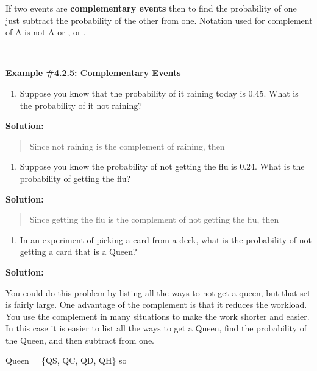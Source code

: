 \documentclass[]{book}
\providecommand{\tightlist}{%
  \setlength{\itemsep}{0pt}\setlength{\parskip}{0pt}}
\begin{document}
If two events are \textbf{complementary events} then to find the probability
of one just subtract the probability of the other from one. Notation
used for complement of A is not A or , or .

\textbf{\\
}

\textbf{Example \#4.2.5: Complementary Events}

\begin{enumerate}
\def\labelenumi{\alph{enumi}.}
\tightlist
\item
  Suppose you know that the probability of it raining today is 0.45.
  What is the probability of it not raining?
\end{enumerate}

\textbf{Solution:}

\begin{quote}
Since not raining is the complement of raining, then
\end{quote}

\begin{enumerate}
\def\labelenumi{\alph{enumi}.}
\setcounter{enumi}{1}
\tightlist
\item
  Suppose you know the probability of not getting the flu is 0.24.
  What is the probability of getting the flu?
\end{enumerate}

\textbf{Solution:}

\begin{quote}
Since getting the flu is the complement of not getting the flu, then
\end{quote}

\begin{enumerate}
\def\labelenumi{\alph{enumi}.}
\setcounter{enumi}{2}
\tightlist
\item
  In an experiment of picking a card from a deck, what is the
  probability of not getting a card that is a Queen?
\end{enumerate}

\textbf{Solution:}

You could do this problem by listing all the ways to not get a
queen, but that set is fairly large. One advantage of the complement
is that it reduces the workload. You use the complement in many
situations to make the work shorter and easier. In this case it is
easier to list all the ways to get a Queen, find the probability of
the Queen, and then subtract from one.

Queen = \{QS, QC, QD, QH\} so
\end{document}
